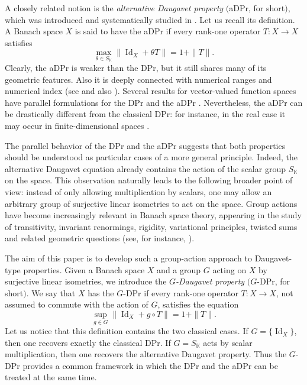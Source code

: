 \documentclass[a4paper,12pt]{amsart}
\theoremstyle{definition}
\theoremstyle{definition}
\theoremstyle{remark}
\numberwithin{equation}{section}
\newcommand{\K}{\mathbb{K}}
\DeclareMathOperator{\id}{Id}
\newcommand{\<}{\langle}
\renewcommand{\>}{\rangle}
\begin{document}
	
	
	
	
	
	
	A closely related notion is the \emph{alternative Daugavet property} $($aDPr, for short$)$, which was introduced and systematically studied in \cite{MO2004}. Let us recall its definition. A Banach space $X$ is said to have the aDPr if every rank-one operator $T:X\to X$ satisfies
	\begin{equation*}
		\max_{\theta\in S_{\K}}\|\id_X+\theta T\|=1+\|T\|.
	\end{equation*}
	Clearly, the aDPr is weaker than the DPr, but it still shares many of its geometric features. Also it is deeply connected with numerical ranges and numerical index (see \cite{MO2004} and also \cite{BonsallDuncanV1,BonsallDuncanV2}). Several results for vector-valued function spaces have parallel formulations for the DPr and the aDPr \cite{MO2004, MartinPaya2000}. Nevertheless, the aDPr can be drastically different from the classical DPr: for instance, in the real case it may occur in finite-dimensional spaces \cite{LMP1999,MO2004}.
	
	The parallel behavior of the DPr and the aDPr suggests that both properties should be understood as particular cases of a more general principle. Indeed, the alternative Daugavet equation already contains the action of the scalar group $S_{\K}$ on the space. This observation naturally leads to the following broader point of view: instead of only allowing multiplication by scalars, one may allow an arbitrary group of surjective linear isometries to act on the space. Group actions have become increasingly relevant in Banach space theory, appearing in the study of transitivity, invariant renormings, rigidity, variational principles, twisted sums and related geometric questions (see, for instance, \cite{AronFalcoMaestre2018,BaderFurmanGelanderMonod2007,BekkaDeLaHarpeValette2008,CastilloFerenczi2023,DantasDouchaJungRaunig2025,DantasFalcoJung2023,  Doucha2026,Falco2021GroupInvariantBishopPhelps,FalcoGarciaJungMaestre2022, FalcoIsert2024, FalcoIsert2026,FerencziRosendal2013,Raunig2025}).
	
	The aim of this paper is to develop such a group-action approach to Daugavet-type properties. Given a Banach space $X$ and a group $G$ acting on $X$ by surjective linear isometries, we introduce the \emph{$G$-Daugavet property} $($$G$-DPr, for short$)$. We say that $X$ has the $G$-DPr if every rank-one operator $T:X\to X$, not assumed to commute with the action of $G$, satisfies the equation
	\begin{equation*}
		\sup_{g\in G}\|\id_X+g\circ T\|=1+\|T\|.
	\end{equation*}
	Let us notice that this definition contains the two classical cases. If $G=\{\id_X\}$, then one recovers exactly the classical DPr. If $G=S_{\K}$ acts by scalar multiplication, then one recovers the alternative Daugavet property. Thus the $G$-DPr provides a common framework in which the DPr and the aDPr can be treated at the same time.
	
\end{document}
